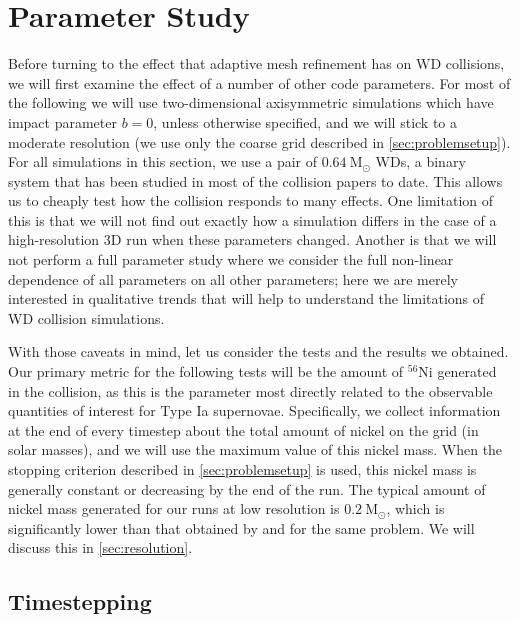 \documentclass[twocolumn,numberedappendix]{../aastex6}
\newcommand{\msolar}{\mathrm{M}_\odot}
\begin{document}
\section{Parameter Study}
\label{sec:parameters}

Before turning to the effect that adaptive mesh refinement has on WD collisions,
we will first examine the effect of a number of other code parameters. For most
of the following we will use two-dimensional axisymmetric simulations which have
impact parameter $b = 0$, unless otherwise specified, and we will stick to a
moderate resolution (we use only the coarse grid described in \autoref{sec:problemsetup}).
For all simulations in this section, we use a pair of $0.64\ \msolar$ WDs, a binary
system that has been studied in most of the collision papers to date. This allows
us to cheaply test how the collision responds to many effects. One limitation of
this is that we will not find out exactly how a simulation differs in the case of a
high-resolution 3D run when these parameters changed. Another is that we will not
perform a full parameter study where we consider the full non-linear dependence of
all parameters on all other parameters; here we are merely interested in qualitative
trends that will help to understand the limitations of WD collision simulations.

With those caveats in mind, let us consider the tests and the results we obtained.
Our primary metric for the following tests will be the amount of $^{56}$Ni generated
in the collision, as this is the parameter most directly related to the observable
quantities of interest for Type Ia supernovae. Specifically, we collect information
at the end of every timestep about the total amount of nickel on the grid (in solar
masses), and we will use the maximum value of this nickel mass. When the stopping
criterion described in \autoref{sec:problemsetup} is used, this nickel mass is generally
constant or decreasing by the end of the run. The typical amount of nickel mass generated
for our runs at low resolution is $0.2\ \msolar$, which is significantly lower than
that obtained by \cite{raskin:2010} and \cite{kushnir:2013} for the same problem.
We will discuss this in \autoref{sec:resolution}.

\subsection{Timestepping}
\label{sec:parameters:timestepping}
\end{document}
